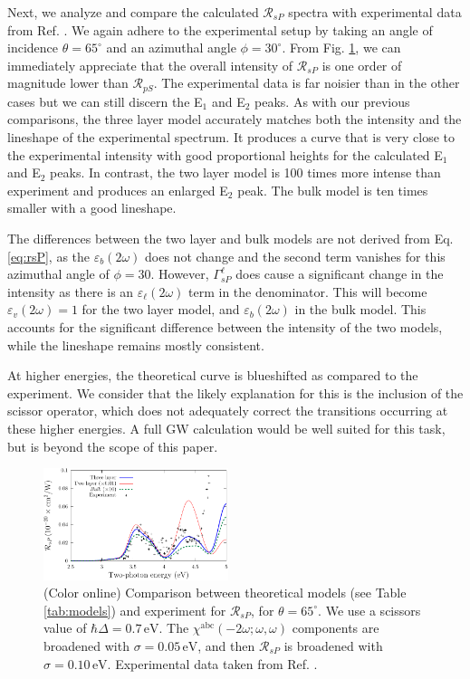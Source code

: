 \documentclass[prb,superscriptaddress,showpacs,twocolumn,letterpaper]{revtex4}
\begin{document}
Next, we analyze and compare the calculated $\mathcal{R}_{sP}$ spectra with
experimental data from Ref. . We again adhere to the
experimental setup by taking an angle of incidence $\theta=65^{\circ}$ and an
azimuthal angle $\phi=30^\circ$. From Fig. \ref{fig:RsP}, we can immediately
appreciate that the overall intensity of $\mathcal{R}_{sP}$ is one order of
magnitude lower than $\mathcal{R}_{pS}$. The experimental data is far noisier
than in the other cases but we can still discern the E$_{1}$ and E$_{2}$ peaks.
As with our previous comparisons, the three layer model accurately matches both
the intensity and the lineshape of the experimental spectrum. It produces a
curve that is very close to the experimental intensity with good proportional
heights for the calculated E$_{1}$ and E$_{2}$ peaks. In contrast, the two layer
model is 100 times more intense than experiment and produces an enlarged E$_{2}$
peak. The bulk model is ten times smaller with a good lineshape.

The differences between the two layer and bulk models are not derived from Eq.
\eqref{eq:rsP}, as the $\varepsilon_{b}(2\omega)$ does not change and the second
term vanishes for this azimuthal angle of $\phi = 30$. However,
$\Gamma^{\ell}_{sP}$ does cause a significant change in the intensity as there
is an $\varepsilon_{\ell}(2\omega)$ term in the denominator. This will become
$\varepsilon_{v}(2\omega) = 1$ for the two layer model, and
$\varepsilon_{b}(2\omega)$ in the bulk model. This accounts for the significant
difference between the intensity of the two models, while the lineshape remains
mostly consistent.

At higher energies, the theoretical curve is blueshifted as compared to the
experiment. We consider that the likely explanation for this is the inclusion of
the scissor operator, which does not adequately correct the transitions
occurring at these higher energies. A full GW calculation would be well suited
for this task, but is beyond the scope of this paper.

\begin{figure}[t]
\centering
\includegraphics[width=0.48\textwidth]{fig6}
\caption{(Color online) Comparison between theoretical models (see Table
\ref{tab:models}) and experiment for $\mathcal{R}_{sP}$, for
$\theta=65^{\circ}$. We use a scissors value of $\hbar\Delta = 0.7\,\text{eV}$.
The $\chi^{\mathrm{abc}}(-2\omega;\omega,\omega)$ components are broadened with
$\sigma=0.05\,\text{eV}$, and then $\mathcal{R}_{sP}$ is broadened with
$\sigma=0.10\,\text{eV}$. Experimental data taken from Ref.
.\label{fig:RsP}}
\end{figure}
\end{document}

